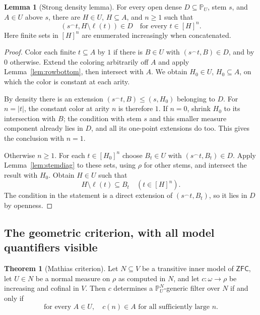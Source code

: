 \documentclass[11pt,letterpaper]{article}
\theoremstyle{definition}
\newtheorem{theorem}[definition]{Theorem}
\newtheorem{lemma}[definition]{Lemma}
\newcommand{\ZFC}{\mathsf{ZFC}}
\newcommand{\PP}{\mathbb P}
\begin{document}
\begin{lemma}[Strong density lemma]\label{lem:strongprikry}
For every open dense $D\subseteq\PP_U$, stem $s$, and $A\in U$ above $s$, there are $H\in U$, $H\subseteq A$, and $n\ge1$ such that
\[
                  (s\mathbin{^\frown}t,H\setminus\ell(t))\in D
                    \quad\text{for every }t\in[H]^n.
\]
Here finite sets in $[H]^n$ are enumerated increasingly when concatenated.
\end{lemma}

\begin{proof}
Color each finite $t\subseteq A$ by $1$ if there is $B\in U$ with $(s\mathbin{^\frown}t,B)\in D$, and by $0$ otherwise. Extend the coloring arbitrarily off $A$ and apply Lemma~\ref{lem:rowbottom}, then intersect with $A$. We obtain $H_0\in U$, $H_0\subseteq A$, on which the color is constant at each arity.

By density there is an extension $(s\mathbin{^\frown}t,B)\le(s,H_0)$ belonging to $D$. For $n=|t|$, the constant color at arity $n$ is therefore $1$. If $n=0$, shrink $H_0$ to its intersection with $B$; the condition with stem $s$ and this smaller measure component already lies in $D$, and all its one-point extensions do too. This gives the conclusion with $n=1$.

Otherwise $n\ge1$. For each $t\in[H_0]^n$ choose $B_t\in U$ with $(s\mathbin{^\frown}t,B_t)\in D$. Apply Lemma~\ref{lem:stemdiag} to these sets, using $\rho$ for other stems, and intersect the result with $H_0$. Obtain $H\in U$ such that
\[
                             H\setminus\ell(t)\subseteq B_t
                      \quad(t\in[H]^n).
\]
The condition in the statement is a direct extension of $(s\mathbin{^\frown}t,B_t)$, so it lies in $D$ by openness.
\end{proof}

\subsection{The geometric criterion, with all model quantifiers visible}

\begin{theorem}[Mathias criterion]\label{thm:mathias}
Let $N\subseteq V$ be a transitive inner model of $\ZFC$, let $U\in N$ be a normal measure on $\rho$ as computed in $N$, and let $c:\omega\to\rho$ be increasing and cofinal in $V$. Then $c$ determines a $\PP_U^N$-generic filter over $N$ if and only if
\[
                 \text{for every }A\in U,
                 \quad c(n)\in A\text{ for all sufficiently large }n.
                 \tag{MC}\label{eq:MC}
\]
\end{theorem}
\end{document}
